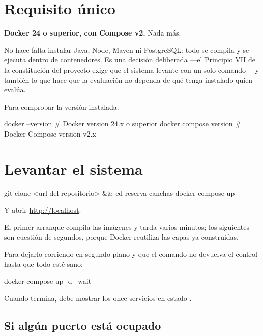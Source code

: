 
\section{Requisito único}

\textbf{Docker 24 o superior, con Compose v2.} Nada más.

No hace falta instalar Java, Node, Maven ni PostgreSQL: todo se compila y se
ejecuta dentro de contenedores. Es una decisión deliberada —el Principio VII de
la constitución del proyecto exige que el sistema levante con un solo comando— y
también lo que hace que la evaluación no dependa de qué tenga instalado quien
evalúa.

Para comprobar la versión instalada:

\begin{comando}
docker --version        # Docker version 24.x o superior
docker compose version  # Docker Compose version v2.x
\end{comando}

\section{Levantar el sistema}

\begin{comando}
git clone <url-del-repositorio> && cd reserva-canchas
docker compose up
\end{comando}

Y abrir \url{http://localhost}.

El primer arranque compila las imágenes y tarda varios minutos; los siguientes
son cuestión de segundos, porque Docker reutiliza las capas ya construidas.

Para dejarlo corriendo en segundo plano y que el comando no devuelva el control
hasta que todo esté sano:

\begin{comando}
docker compose up -d --wait
\end{comando}

Cuando termina,  debe mostrar los once servicios en
estado .

\subsection{Si algún puerto está ocupado}

